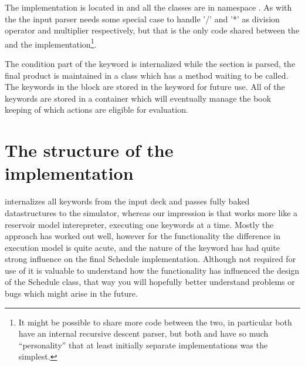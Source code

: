 The \actionx{} implementation is located in
 and all the classes are in namespace
. As with the \udq{} the input parser needs some special
case to handle '/' and '*' as division operator and multiplier respectively, but
that is the only code shared between the \udq{} and the \actionx{}
implementation\footnote{It might be possible to share more code between the two,
in particular both have an internal recursive descent parser, but both \udq{}
and \actionx{} have so much ``personality'' that at least initially separate
implementations was the simplest.}.

The condition part of the \actionx{} keyword is internalized while the
 section is parsed, the final product is maintained in a class
 which has a  method waiting to
be called. The keywords in the \actionx{} block are stored in the
 keyword for future use. All of the \actionx{}
keywords are stored in a container  which will
eventually manage the book keeping of which actions are eligible for evaluation.

\section{The structure of the  implementation}
\label{schedule_design}
\flow{} internalizes all keywords from the input deck and passes fully baked
datastructures to the simulator, whereas our impression is that \eclipse{} works
more like a reservoir model interepreter, executing one keywords at a time.
Mostly the \flow{} approach has worked out well, however for the \actionx{}
functionality the difference in execution model is quite acute, and the nature
of the \actionx{} keyword has had quite strong influence on the final Schedule
implementation. Although not required for use of \actionx{} it is valuable to
understand how the \actionx{} functionality has influenced the design of the
Schedule class, that way you will hopefully better understand problems or bugs
which might arise in the future.

